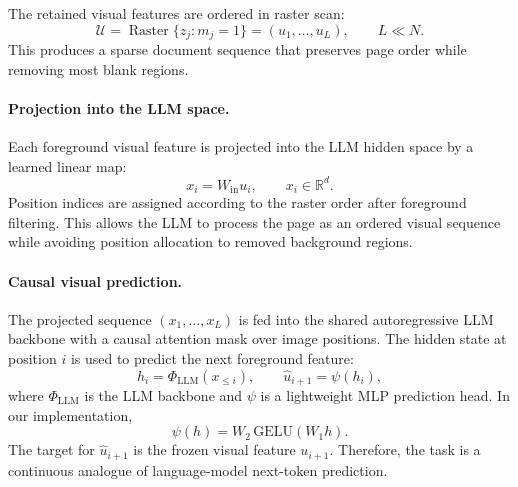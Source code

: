 The retained visual features are ordered in raster scan:
\begin{equation}
\mathcal{U}
=
\operatorname{Raster}\{z_j:m_j=1\}
=
(u_1,\ldots,u_L),
\qquad
L\ll N .
\label{eq:appendix_foreground_sequence}
\end{equation}
This produces a sparse document sequence that preserves page order while removing most blank regions.

\paragraph{Projection into the LLM space.}
Each foreground visual feature is projected into the LLM hidden space by a learned linear map:
\begin{equation}
x_i
=
W_{\mathrm{in}}u_i,
\qquad
x_i\in\mathbb{R}^{d}.
\label{eq:appendix_visual_projection}
\end{equation}
Position indices are assigned according to the raster order after foreground filtering. This allows the LLM to process the page as an ordered visual sequence while avoiding position allocation to removed background regions.

\paragraph{Causal visual prediction.}
The projected sequence $(x_1,\ldots,x_L)$ is fed into the shared autoregressive LLM backbone with a causal attention mask over image positions. The hidden state at position $i$ is used to predict the next foreground feature:
\begin{equation}
h_i
=
\Phi_{\mathrm{LLM}}(x_{\leq i}),
\qquad
\hat{u}_{i+1}
=
\psi(h_i),
\label{eq:appendix_vp_forward}
\end{equation}
where $\Phi_{\mathrm{LLM}}$ is the LLM backbone and $\psi$ is a lightweight MLP prediction head. In our implementation,
\begin{equation}
\psi(h)
=
W_2\,\mathrm{GELU}(W_1h).
\label{eq:appendix_prediction_head}
\end{equation}
The target for $\hat{u}_{i+1}$ is the frozen visual feature $u_{i+1}$. Therefore, the task is a continuous analogue of language-model next-token prediction.

